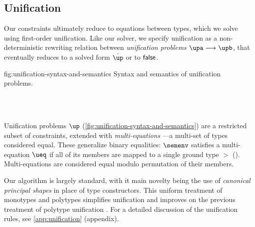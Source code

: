 \documentclass[acmsmall,screen,nonacm,review]{acmart}
\begin{document}
\subsection{Unification}
%
Our constraints ultimately reduce to equations between types, which we solve
using first-order unification. Like our solver, we specify unification as a
non-deterministic rewriting relation between \emph{unification problems} $\upa
\unif \upb$, that eventually reduces to a solved form $\hat\up$ or to $\mathsf{false}$.

\begin{mathparfig}[htpb!]
  {fig:unification-syntax-and-semantics}
  {Syntax and semantics of unification problems.
  }
\begin{minipage}[c]{0.7\textwidth}
\begin{bnfgrammar}
   \\
   \\
  \entry[Constraints]{\c}{
    \dots \and \ueq
  }
\end{bnfgrammar}
\end{minipage}
\hfill
{}
\end{mathparfig}


Unification problems $\up$
(\cref{fig:unification-syntax-and-semantics}) are a restricted subset
of constraints, extended with \emph{multi-equations}
\citep*{Pottier-Remy/emlti}---a multi-set of types considered
equal. These generalize binary equalities: $\semenv$ satisfies
a multi-equation $\ueq$ if all of its members are mapped to a single
ground type $\gt$ (). Multi-equations are
considered equal modulo permutation of their members.

Our algorithm is largely standard, with it main novelty being the use
of \emph{canonical principal shapes} in place of type constructors. This
uniform treatment of monotypes and polytypes simplifies unification and improves
on the previous treatment of polytype unification \citep{Garrigue-Remy/poly-ml}.
For a detailed discussion of the unification rules, see
\cref{app:unification} (appendix).
\end{document}
